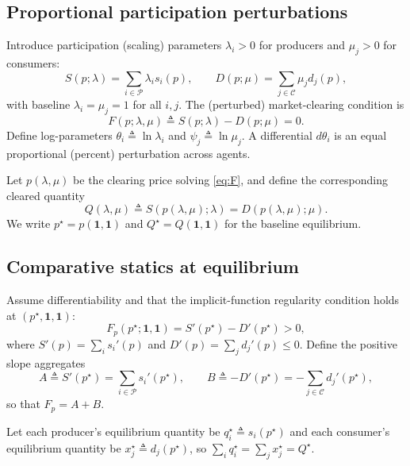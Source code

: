 \documentclass[journal, a4paper]{IEEEtran}
\begin{document}
\subsection{Proportional participation perturbations}
Introduce participation (scaling) parameters $\lambda_i>0$ for producers and $\mu_j>0$ for consumers:
\begin{equation}
S(p;\lambda)=\sum_{i\in\mathcal{P}} \lambda_i s_i(p),\qquad
D(p;\mu)=\sum_{j\in\mathcal{C}} \mu_j d_j(p),
\end{equation}
with baseline $\lambda_i=\mu_j=1$ for all $i,j$. The (perturbed) market-clearing condition is
\begin{equation}
F(p;\lambda,\mu)\triangleq S(p;\lambda)-D(p;\mu)=0.
\label{eq:F}
\end{equation}
Define log-parameters $\theta_i\triangleq \ln \lambda_i$ and $\psi_j\triangleq \ln \mu_j$. A differential $d\theta_i$ is an equal proportional (percent) perturbation across agents.

Let $p(\lambda,\mu)$ be the clearing price solving \eqref{eq:F}, and define the corresponding cleared quantity
\begin{equation}
Q(\lambda,\mu)\triangleq S(p(\lambda,\mu);\lambda)=D(p(\lambda,\mu);\mu).
\end{equation}
We write $p^\star=p(\mathbf{1},\mathbf{1})$ and $Q^\star=Q(\mathbf{1},\mathbf{1})$ for the baseline equilibrium.

\subsection{Comparative statics at equilibrium}
Assume differentiability and that the implicit-function regularity condition holds at $(p^\star,\mathbf{1},\mathbf{1})$:
\begin{equation}
F_p(p^\star;\mathbf{1},\mathbf{1})=S'(p^\star)-D'(p^\star)>0,
\end{equation}
where $S'(p)=\sum_{i} s_i'(p)$ and $D'(p)=\sum_{j} d_j'(p)\le 0$. Define the positive slope aggregates
\begin{equation}
A \triangleq S'(p^\star)=\sum_{i\in\mathcal{P}} s_i'(p^\star),\qquad
B \triangleq -D'(p^\star)= -\sum_{j\in\mathcal{C}} d_j'(p^\star),
\label{eq:AB}
\end{equation}
so that $F_p=A+B$.

Let each producer's equilibrium quantity be $q_i^\star \triangleq s_i(p^\star)$ and each consumer's equilibrium quantity be $x_j^\star \triangleq d_j(p^\star)$, so $\sum_i q_i^\star=\sum_j x_j^\star=Q^\star$.
\end{document}
